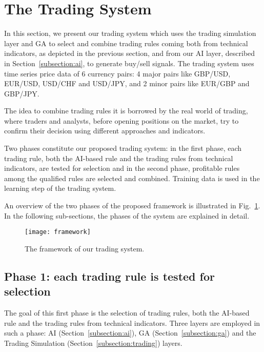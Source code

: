 \section{The Trading System}
\label{sec:tradsys}
In this section, we present our trading system which uses the trading simulation layer and GA to select and combine trading rules coming both from technical indicators, as depicted in the previous section, and from our AI layer, described in Section~\ref{subsection:ai}, to generate buy/sell signals. The trading system uses time series price data of 6 currency pairs: 4 major pairs like GBP/USD, EUR/USD, USD/CHF and USD/JPY, and 2 minor pairs like EUR/GBP and GBP/JPY.

The idea to combine trading rules it is borrowed by the real world of trading, where traders and analysts, before opening positions on the market, try to confirm their decision using different approaches and indicators. 

Two phases constitute our proposed trading system: in the first phase, each trading rule, both the AI-based rule and the trading rules from technical indicators, are tested for selection and in the second phase, profitable rules among the qualified rules are selected and combined. Training data is used in the learning step of the trading system.

An overview of the two phases of the proposed framework is illustrated in Fig.~\ref{fig:sys}. In the following sub-sections, the phases of the system are explained in detail.

\begin{figure}[h]
\texttt{[image: framework]}
\centering
\caption{The framework of our trading system.}
\label{fig:sys} 
\end{figure}

\subsection{Phase 1: each trading rule is tested for selection}
The goal of this first phase is the selection of trading rules, both the AI-based rule and the trading rules from technical indicators. Three layers are employed in such a phase: AI (Section~\ref{subsection:ai}), GA (Section~\ref{subsection:ga}) and the Trading Simulation (Section~\ref{subsection:trading}) layers. 

